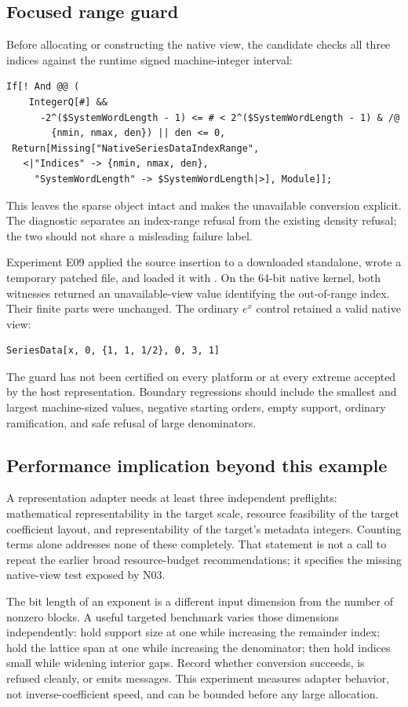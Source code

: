\documentclass[11pt,a4paper]{article}
\newcommand{\code}[1]{\texttt{\detokenize{#1}}}
\begin{document}
\subsection{Focused range guard}
Before allocating or constructing the native view, the candidate checks all three indices against the runtime signed machine-integer interval:
\begin{lstlisting}
If[! And @@ (
    IntegerQ[#] &&
      -2^($SystemWordLength - 1) <= # < 2^($SystemWordLength - 1) & /@
        {nmin, nmax, den}) || den <= 0,
 Return[Missing["NativeSeriesDataIndexRange",
   <|"Indices" -> {nmin, nmax, den},
     "SystemWordLength" -> $SystemWordLength|>], Module]];
\end{lstlisting}
This leaves the sparse object intact and makes the unavailable conversion explicit. The diagnostic separates an index-range refusal from the existing density refusal; the two should not share a misleading failure label.

Experiment E09 applied the source insertion to a downloaded standalone, wrote a temporary patched file, and loaded it with \code{Get}. On the 64-bit native kernel, both witnesses returned an unavailable-view \code{Missing} value identifying the out-of-range index. Their finite parts were unchanged. The ordinary \(e^x\) control retained a valid native view:
\begin{lstlisting}
SeriesData[x, 0, {1, 1, 1/2}, 0, 3, 1]
\end{lstlisting}
The guard has not been certified on every platform or at every extreme accepted by the host representation. Boundary regressions should include the smallest and largest machine-sized values, negative starting orders, empty support, ordinary ramification, and safe refusal of large denominators.

\subsection{Performance implication beyond this example}
A representation adapter needs at least three independent preflights: mathematical representability in the target scale, resource feasibility of the target coefficient layout, and representability of the target's metadata integers. Counting terms alone addresses none of these completely. That statement is not a call to repeat the earlier broad resource-budget recommendations; it specifies the missing native-view test exposed by N03.

The bit length of an exponent is a different input dimension from the number of nonzero blocks. A useful targeted benchmark varies those dimensions independently: hold support size at one while increasing the remainder index; hold the lattice span at one while increasing the denominator; then hold indices small while widening interior gaps. Record whether conversion succeeds, is refused cleanly, or emits messages. This experiment measures adapter behavior, not inverse-coefficient speed, and can be bounded before any large allocation.
\end{document}
